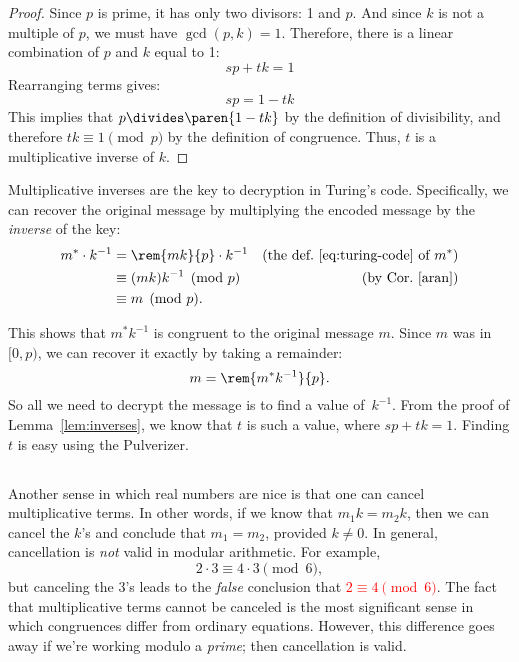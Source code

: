 \begin{proof}
Since $p$ is prime, it has only two divisors: 1 and $p$.  And since
$k$ is not a multiple of $p$, we must have $\gcd(p, k) = 1$.
Therefore, there is a linear combination of $p$ and $k$ equal to 1:
%
\[
s p + t k = 1
\]
%
Rearranging terms gives:
%
\[
s p = 1 - t k
\]
%
This implies that $p \divides \paren{1 - tk}$ by the definition of divisibility,
and therefore $tk \equiv 1 \pmod{p}$ by the definition of congruence.
Thus, $t$ is a multiplicative inverse of $k$.
\end{proof}

Multiplicative inverses are the key to decryption in Turing's code.
Specifically, we can recover the original message by multiplying the
encoded message by the \emph{inverse} of the key:
\begin{align*}
m^* \cdot k^{-1}
    & = \rem{mk}{p} \cdot k^{-1}
         & \text{(the def.~\eqref{eq:turing-code} of $m^*$)}\\
    & \equiv (mk)k^{-1} \pmod{p} & \text{(by Cor.~\ref{aran})}\\
    & \equiv m \pmod{p}.
\end{align*}

This shows that $m^* k^{-1}$ is congruent to the original message $m$.
Since $m$ was in $[0,p)$, we can recover it exactly by taking a
remainder:
%
\[
m = \rem{m^* k^{-1}}{p}.
\]
%
So all we need to decrypt the message is to find a value of~$k^{-1}$.
From the proof of Lemma~\ref{lem:inverses}, we know that $t$ is such a
value, where $sp + tk = 1$.  Finding $t$ is easy using the Pulverizer.

\subsection{}

Another sense in which real numbers are nice is that one can cancel
multiplicative terms.  In other words, if we know that $m_1 k = m_2 k$,
then we can cancel the $k$'s and conclude that $m_1 = m_2$, provided $k
\neq 0$.  In general, cancellation is \emph{not} valid in modular
arithmetic.  For example,
%
\[
2 \cdot 3 \equiv 4 \cdot 3 \pmod{6},
\]
%
but canceling the 3's leads to the \emph{false} conclusion
that \textcolor{red}{$2 \equiv 4 \pmod{6}$}.  The fact that
multiplicative terms cannot be canceled is the most significant
sense in which congruences differ from ordinary equations.  However,
this difference goes away if we're working modulo a
\emph{prime}; then cancellation is valid.

